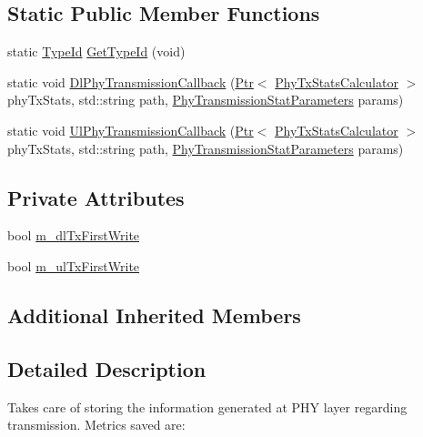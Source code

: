 \subsection*{Static Public Member Functions}
\begin{DoxyCompactItemize}
\item 
static \hyperlink{classns3_1_1TypeId}{Type\+Id} \hyperlink{classns3_1_1PhyTxStatsCalculator_a0e75ea7914acf2fa842860f02523fab1}{Get\+Type\+Id} (void)
\item 
static void \hyperlink{classns3_1_1PhyTxStatsCalculator_a47ca61609fac1d4b1d4a448e4abd0112}{Dl\+Phy\+Transmission\+Callback} (\hyperlink{classns3_1_1Ptr}{Ptr}$<$ \hyperlink{classns3_1_1PhyTxStatsCalculator}{Phy\+Tx\+Stats\+Calculator} $>$ phy\+Tx\+Stats, std\+::string path, \hyperlink{structns3_1_1PhyTransmissionStatParameters}{Phy\+Transmission\+Stat\+Parameters} params)
\item 
static void \hyperlink{classns3_1_1PhyTxStatsCalculator_aef569e43f00277d362b150e78e6828ae}{Ul\+Phy\+Transmission\+Callback} (\hyperlink{classns3_1_1Ptr}{Ptr}$<$ \hyperlink{classns3_1_1PhyTxStatsCalculator}{Phy\+Tx\+Stats\+Calculator} $>$ phy\+Tx\+Stats, std\+::string path, \hyperlink{structns3_1_1PhyTransmissionStatParameters}{Phy\+Transmission\+Stat\+Parameters} params)
\end{DoxyCompactItemize}
\subsection*{Private Attributes}
\begin{DoxyCompactItemize}
\item 
bool \hyperlink{classns3_1_1PhyTxStatsCalculator_a40a7d5c881ec2afa20a757bb9531fdea}{m\+\_\+dl\+Tx\+First\+Write}
\item 
bool \hyperlink{classns3_1_1PhyTxStatsCalculator_a1328443e41261755f0d22cdeef281ef5}{m\+\_\+ul\+Tx\+First\+Write}
\end{DoxyCompactItemize}
\subsection*{Additional Inherited Members}


\subsection{Detailed Description}
Takes care of storing the information generated at P\+HY layer regarding transmission. Metrics saved are\+:



